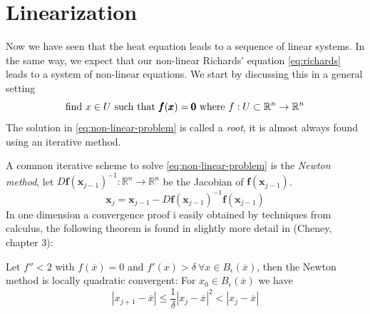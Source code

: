 \documentclass[../Main/main.tex]{subfiles}
\begin{document}
	\section*{Linearization}
	Now we have seen that the heat equation leads to a sequence of linear systems. In the same way, we expect that our non-linear Richards' equation \eqref{eq:richards} leads to a system of non-linear equations. We start by discussing this in a general setting
	\begin{equation}\label{eq:non-linear-problem}
		\text{find }x\in U \text{ such that }\pmb{f}(\pmb{x})=\pmb{0} \\ \text{ where } f:U\subset\mathbb{R}^n\rightarrow\mathbb{R}^n
	\end{equation}
	The solution in \eqref{eq:non-linear-problem} is called a \emph{root}, it is almost always found using an iterative method.\par 
	A common iterative scheme to solve \eqref{eq:non-linear-problem} is the \emph{Newton method}, let $D\pmb{f}(\pmb{x}_{j-1})^{-1}:\mathbb{R}^n\rightarrow\mathbb{R}^n$ be the Jacobian of $\pmb{f}(\pmb{x}_{j-1})$.
	\begin{equation}
		\pmb{x}_j = \pmb{x}_{j-1} -D\pmb{f}(\pmb{x}_{j-1})^{-1}\pmb{f}(\pmb{x}_{j-1})
	\end{equation}
	In one dimension a convergence proof i easily obtained by techniques from calculus, the following theorem is found in  slightly more detail in (Cheney\cite{Cheney}, chapter 3):
	\begin{theorem}
		Let $f''<2$ with $f(\overline{x})=0$ and $f'(x)> \delta \ \forall x \in B_{\epsilon}(\overline{x})$, then the Newton method is locally quadratic convergent:  For $x_0\in B_{\epsilon}(\overline{x})$ we have
		\begin{equation}
			| x_{j+1}-\overline{x}| \leq \frac{1}{\delta}|x_j - \overline{x}|^2< |x_j-\overline{x}|
		\end{equation}
	\end{theorem}
\end{document}
